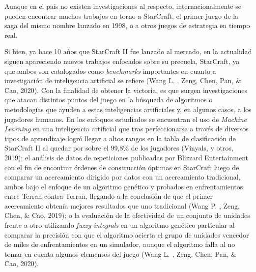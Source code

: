 Aunque en el país no existen investigaciones al respecto, internacionalmente se pueden encontrar muchos trabajos en torno a StarCraft, el primer juego de la saga del mismo nombre lanzado en 1998, o a otros juegos de estrategia en tiempo real.

Si bien, ya hace 10 años que StarCraft II fue lanzado al mercado, en la actualidad siguen apareciendo nuevos trabajos enfocados sobre su precuela, StarCraft, ya que ambos son catalogados como \textit{benchmarks} importantes en cuanto a investigación de inteligencia artificial se refiere (Wang L. , Zeng, Chen, Pan, \& Cao, 2020). Con la finalidad de obtener la victoria, es que surgen investigaciones que atacan distintos puntos del juego en la búsqueda de algoritmos o metodologías que ayuden a estas inteligencias artificiales y, en algunos casos, a los jugadores humanos. En los enfoques estudiados se encuentran el uso de \textit{Machine Learning} en una inteligencia artificial que tras perfeccionarse a través de diversos tipos de aprendizaje logró llegar a altos rangos en la tabla de clasificación de StarCraft II al quedar por sobre el 99,8\% de los jugadores (Vinyals, y otros, 2019); el análisis de datos de repeticiones publicadas por Blizzard Entertainment con el fin de encontrar órdenes de construcción óptimas en StarCraft luego de comparar un acercamiento dirigido por datos con un acercamiento tradicional, ambos bajo el enfoque de un algoritmo genético y probados en enfrentamientos entre Terran contra Terran, llegando a la conclusión de que el primer acercamiento obtenía mejores resultados que uno tradicional (Wang P. , Zeng, Chen, \& Cao, 2019); o la evaluación de la efectividad de un conjunto de unidades frente a otro utilizando \textit{fuzzy integrals} en un algoritmo genético particular al comparar la precisión con que el algoritmo acierta el grupo de unidades vencedor de miles de enfrentamientos en un simulador, aunque el algoritmo falla al no tomar en cuenta algunos elementos del juego (Wang L. , Zeng, Chen, Pan, \& Cao, 2020).

